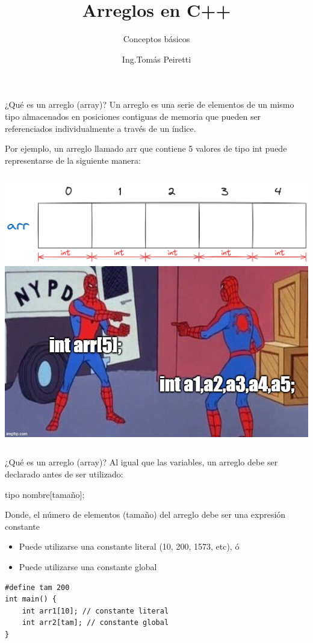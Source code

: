 \documentclass[12pt]{beamer}
\title{Arreglos en C++}
\subtitle{Conceptos básicos}
\author{Ing.Tomás Peiretti}
\date{}
\begin{document}
\maketitle

\begin{frame}{¿Qué es un arreglo (array)?}
    Un arreglo es una \alert{serie de elementos de un mismo tipo} almacenados en posiciones contiguas de memoria que pueden ser referenciados individualmente a través de un índice.

    \medskip

    Por ejemplo, un arreglo llamado \alert{arr} que contiene 5 valores de tipo \alert{int} puede representarse de la siguiente manera:

    \medskip
    \begin{columns}
        \includegraphics[width=\textwidth]{array1.png}
        \includegraphics[width=\textwidth]{meme.jpg}
    \end{columns}
\end{frame}

\begin{frame}[fragile]{¿Qué es un arreglo (array)?}
    Al igual que las variables, un arreglo debe ser declarado antes de ser utilizado:
    \begin{center}
        \alert{tipo} nombre[tamaño];
    \end{center}

    Donde, el número de elementos (tamaño) del arreglo debe ser una expresión constante
    \begin{itemize}
        \item Puede utilizarse una constante literal (10, 200, 1573, etc), ó
        \item Puede utilizarse una constante global
    \end{itemize}
\begin{lstlisting}
#define tam 200
int main() {
    int arr1[10]; // constante literal
    int arr2[tam]; // constante global
}
\end{lstlisting}
\end{frame}
\end{document}
